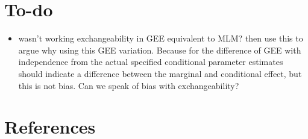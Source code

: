 \documentclass[
  12pt,
  a4paper,
]{article}
\providecommand{\tightlist}{%
  \setlength{\itemsep}{0pt}\setlength{\parskip}{0pt}}\usepackage{longtable,booktabs,array}
\begin{document}
\section{To-do}\label{to-do}

\begin{itemize}
\tightlist
\item
  wasn't working exchangeability in GEE equivalent to MLM? then use this
  to argue why using this GEE variation. Because for the difference of
  GEE with independence from the actual specified conditional parameter
  estimates should indicate a difference between the marginal and
  conditional effect, but this is not bias. Can we speak of bias with
  exchangeability?
\end{itemize}

\newpage

\section{References}\label{references}
\end{document}
